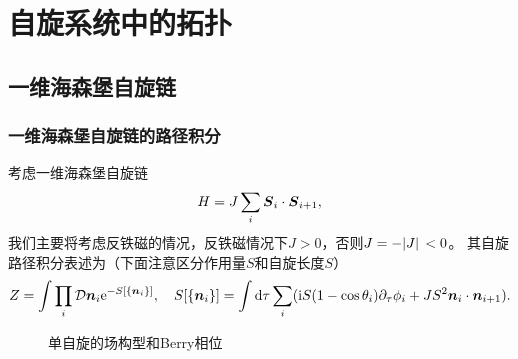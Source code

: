 \chapter{自旋系统中的拓扑}

\section{一维海森堡自旋链}

\subsection{一维海森堡自旋链的路径积分}



考虑一维海森堡自旋链
\begin{equation}
    H = J \sum_{i} \vb*{S}_i \cdot \vb*{S}_{i+1}, 
\end{equation}
我们主要将考虑反铁磁的情况，反铁磁情况下$J>0$，否则$J = - \abs*{J} < 0$。
其自旋路径积分表述为（下面注意区分作用量$S$和自旋长度$S$）
\begin{equation}
    Z = \int \prod_i \mathcal{D} \vb*{n}_i \mathrm{e}^{-S[\{\vb*{n}_i\}]} , \quad S[\{\vb*{n}_i\}] = \int \dd{\tau} \sum_i ( \mathrm{i} S (1 - \cos \theta_i) \partial_\tau \phi_i + J S^2 \vb*{n}_i \cdot \vb*{n}_{i+1} ).
\end{equation}

\begin{figure}
    \centering
    \caption{单自旋的场构型和Berry相位}
\end{figure}

